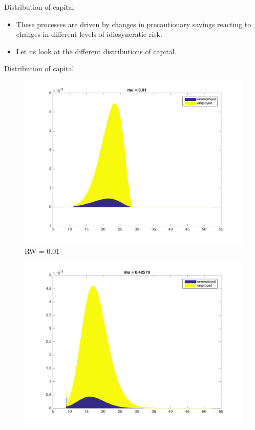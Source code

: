 \documentclass{beamer}
\begin{document}
	
\begin{frame}{Distribution of capital}
	\begin{itemize}
	
	\item {
These processes are driven by changes in precautionary savings reacting to changes in different levels of idiosyncratic risk. 
	}
	\item {
Let us look at the different distributions of capital. 
	}

	\end{itemize} 
\end{frame}



\begin{frame}{Distribution of capital}
 
\begin{figure}[!tbp]
  \centering
  \begin{minipage}[b]{0.32\textwidth}
    \includegraphics[width=\textwidth]{distribution1}
    	\\RW = 0.01 
  \end{minipage}
  \hfill
  \begin{minipage}[b]{0.32\textwidth}
    \includegraphics[width=\textwidth]{distribution2}

\end{minipage}
\end{figure}
\end{frame}
\end{document}
